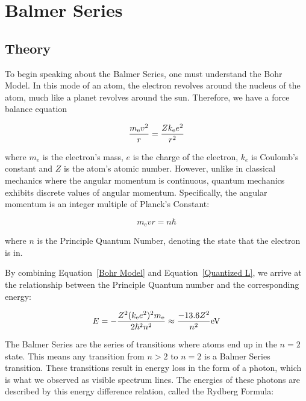 \section{Balmer Series}
\subsection{Theory}

To begin speaking about the Balmer Series, one must understand the Bohr Model. In this mode of an atom, the electron revolves around the nucleus of the atom, much like a planet revolves around the sun. Therefore, we have a force balance equation 

\begin{equation}
    {m_\mathrm{e} v^2\over r} = {Zk_\mathrm{e} e^2 \over r^2} 
   \label{Bohr Model}
\end{equation}

where $m_e$ is the electron's mass, $e$ is the charge of the electron, $k_e$ is Coulomb's constant and $Z$ is the atom's atomic number. However, unlike in classical mechanics where the angular momentum is continuous, quantum mechanics exhibits discrete values of angular momentum. Specifically, the angular momentum is an integer multiple of Planck's Constant:

\begin{equation}
     m_\mathrm{e} v r = n \hbar 
   \label{Quantized L}
\end{equation}

where $n$ is the Principle Quantum Number, denoting the state that the electron is in. 

By combining Equation~\ref{Bohr Model} and Equation~\ref{Quantized L}, we arrive at the relationship between the Principle Quantum number and the corresponding energy:

\begin{equation}
      E = - { Z^2(k_\mathrm{e} e^2)^2 m_\mathrm{e} \over 2\hbar^2 n^2} \approx {-13.6Z^2 \over n^2}\mathrm{eV}
   \label{Energy Level for nth Level}
\end{equation} 

The Balmer Series are the series of transitions where atoms end up in the $n = 2$ state. This means any transition from $n > 2$ to $n = 2$ is a Balmer Series transition. These transitions result in energy loss in the form of a photon, which is what we observed as visible spectrum lines. The energies of these photons are described by this energy difference relation, called the Rydberg Formula:

